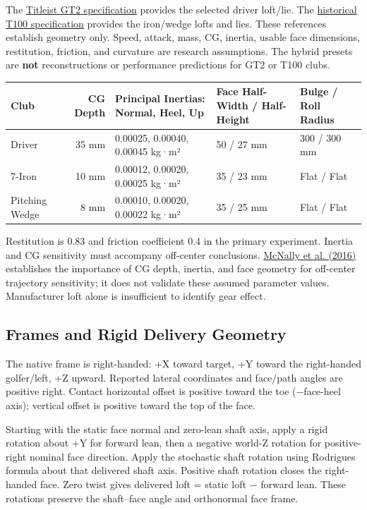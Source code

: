 \documentclass[
]{article}
\begin{document}
The \href{https://www.titleist.com/golf-clubs/drivers/gt2}{Titleist GT2
specification} provides the selected driver loft/lie. The
\href{https://www.titleist.com/golf-clubs/irons/720-t100}{historical
T100 specification} provides the iron/wedge lofts and lies. These
references establish geometry only. Speed, attack, mass, CG, inertia,
usable face dimensions, restitution, friction, and curvature are
research assumptions. The hybrid presets are \textbf{not}
reconstructions or performance predictions for GT2 or T100 clubs.

\begin{longtable}[]{@{}lrlll@{}}
\toprule\noalign{}
Club & CG Depth & Principal Inertias: Normal, Heel, Up & Face Half-Width
/ Half-Height & Bulge / Roll Radius \\
\midrule\noalign{}
\endhead
\bottomrule\noalign{}
\endlastfoot
Driver & 35 mm & 0.00025, 0.00040, 0.00045 kg·m² & 50 / 27 mm & 300 /
300 mm \\
7-Iron & 10 mm & 0.00012, 0.00020, 0.00025 kg·m² & 35 / 23 mm & Flat /
Flat \\
Pitching Wedge & 8 mm & 0.00010, 0.00020, 0.00022 kg·m² & 35 / 25 mm &
Flat / Flat \\
\end{longtable}

Restitution is 0.83 and friction coefficient 0.4 in the primary
experiment. Inertia and CG sensitivity must accompany off-center
conclusions. \href{https://doi.org/10.1016/j.proeng.2016.06.329}{McNally
et al. (2016)} establishes the importance of CG depth, inertia, and face
geometry for off-center trajectory sensitivity; it does not validate
these assumed parameter values. Manufacturer loft alone is insufficient
to identify gear effect.

\subsection{Frames and Rigid Delivery
Geometry}\label{frames-and-rigid-delivery-geometry}

The native frame is right-handed: +X toward target, +Y toward the
right-handed golfer/left, +Z upward. Reported lateral coordinates and
face/path angles are positive right. Contact horizontal offset is
positive toward the toe (−face-heel axis); vertical offset is positive
toward the top of the face.

Starting with the static face normal and zero-lean shaft axis, apply a
rigid rotation about +Y for forward lean, then a negative world-Z
rotation for positive-right nominal face direction. Apply the stochastic
shaft rotation using Rodrigues\textquotesingle{} formula about that
delivered shaft axis. Positive shaft rotation closes the right-handed
face. Zero twist gives delivered loft = static loft − forward lean.
These rotations preserve the shaft--face angle and orthonormal face
frame.
\end{document}

